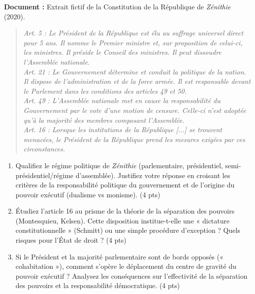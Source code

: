 \documentclass[11pt]{article}
\begin{document}
\begin{exercice}
\textbf{Document :} Extrait fictif de la Constitution de la République de \textit{Zénithie} (2020).
\begin{quote}
\textit{Art. 5 : Le Président de la République est élu au suffrage universel direct pour 5 ans. Il nomme le Premier ministre et, sur proposition de celui-ci, les ministres. Il préside le Conseil des ministres. Il peut dissoudre l'Assemblée nationale.\\
Art. 21 : Le Gouvernement détermine et conduit la politique de la nation. Il dispose de l'administration et de la force armée. Il est responsable devant le Parlement dans les conditions des articles 49 et 50.\\
Art. 49 : L'Assemblée nationale met en cause la responsabilité du Gouvernement par le vote d'une motion de censure. Celle-ci n'est adoptée qu'à la majorité des membres composant l'Assemblée.\\
Art. 16 : Lorsque les institutions de la République [...] se trouvent menacées, le Président de la République prend les mesures exigées par ces circonstances.}
\end{quote}
\begin{enumerate}
    \item Qualifiez le régime politique de \textit{Zénithie} (parlementaire, présidentiel, semi-présidentiel/régime d'assemblée). Justifiez votre réponse en croisant les critères de la responsabilité politique du gouvernement et de l'origine du pouvoir exécutif (dualisme vs monisme). (4 pts)
    \item Étudiez l'article 16 au prisme de la théorie de la séparation des pouvoirs (Montesquieu, Kelsen). Cette disposition institue-t-elle une « dictature constitutionnelle » (Schmitt) ou une simple procédure d'exception ? Quels risques pour l'État de droit ? (4 pts)
    \item Si le Président et la majorité parlementaire sont de bords opposés (« cohabitation »), comment s'opère le déplacement du centre de gravité du pouvoir exécutif ? Analysez les conséquences sur l'effectivité de la séparation des pouvoirs et la responsabilité démocratique. (4 pts)
\end{enumerate}
\end{exercice}
\end{document}
